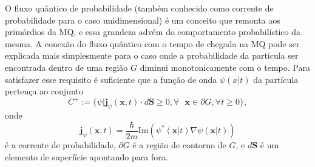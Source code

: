 O fluxo quântico de probabilidade (também conhecido como corrente de probabilidade para o caso unidimensional) é um conceito que remonta aos primórdios da MQ, e essa grandeza advém do comportamento probabilístico da mesma. A conexão do fluxo quântico com o tempo de chegada na MQ pode ser explicada mais simplesmente  para o caso onde a probabilidade da partícula ser encontrada dentro de uma região $G$ diminui monotonicamente com o tempo. Para satisfazer esse requisito é suficiente que a função de onda $\psi(x|t)$ da partícula pertença ao conjunto
\begin{equation}\label{eqJ1}
	C^+ := \{ \psi | \textbf{j}_{\psi} (\mathbf{x}, t) \cdot d \textbf{S} \geqslant 0, \forall \text{ } \mathbf{x} \in \partial G, \forall t \geqslant 0\},
\end{equation}
onde 
\begin{equation}\label{eqJ2}
  \mathbf{j}_{\psi} (\mathbf{x}, t) = \frac{\hbar}{2m} \mathrm{Im}\left( \psi^*(\mathbf{x}| t) \nabla \psi(\mathbf{x}| t) \right)
\end{equation}
é a corrente de probabilidade, $\partial G$ é a região de contorno de $G$, e $d \textbf{S}$ é um elemento de superfície apontando para fora. 


